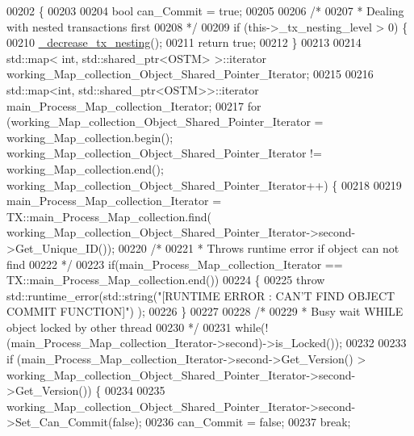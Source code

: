 \begin{DoxyCode}
00202                 \{
00203 
00204     \textcolor{keywordtype}{bool} can\_Commit = \textcolor{keyword}{true};
00205  
00206     \textcolor{comment}{/*}
00207 \textcolor{comment}{     * Dealing with nested transactions first 
}
00208 \textcolor{comment}{     */}
00209     \textcolor{keywordflow}{if} (this->\_tx\_nesting\_level > 0) \{
00210         \hyperlink{class_t_x_aa3ac499f576326588628ade96b27b4b1}{\_decrease\_tx\_nesting}();
00211         \textcolor{keywordflow}{return} \textcolor{keyword}{true};
00212     \} 
00213     
00214     std::map< int, std::shared\_ptr<OSTM> >::iterator working\_Map\_collection\_Object\_Shared\_Pointer\_Iterator;
00215 
00216     std::map<int, std::shared\_ptr<OSTM>>::iterator main\_Process\_Map\_collection\_Iterator;
00217     \textcolor{keywordflow}{for} (working\_Map\_collection\_Object\_Shared\_Pointer\_Iterator = working\_Map\_collection.begin(); 
      working\_Map\_collection\_Object\_Shared\_Pointer\_Iterator != working\_Map\_collection.end(); 
      working\_Map\_collection\_Object\_Shared\_Pointer\_Iterator++) \{
00218 
00219             main\_Process\_Map\_collection\_Iterator = TX::main\_Process\_Map\_collection.find(
      working\_Map\_collection\_Object\_Shared\_Pointer\_Iterator->second->Get\_Unique\_ID());
00220             \textcolor{comment}{/*}
00221 \textcolor{comment}{             * Throws runtime error if object can not find
}
00222 \textcolor{comment}{             */}
00223             \textcolor{keywordflow}{if}(main\_Process\_Map\_collection\_Iterator == TX::main\_Process\_Map\_collection.end())
00224             \{
00225                 \textcolor{keywordflow}{throw} std::runtime\_error(std::string(\textcolor{stringliteral}{"[RUNTIME ERROR : CAN'T FIND OBJECT COMMIT FUNCTION]"})
      );
00226             \}
00227 
00228         \textcolor{comment}{/*}
00229 \textcolor{comment}{         * Busy wait WHILE object locked by other thread
}
00230 \textcolor{comment}{         */}
00231         \textcolor{keywordflow}{while}(!(main\_Process\_Map\_collection\_Iterator->second)->is\_Locked());
00232 
00233         \textcolor{keywordflow}{if} (main\_Process\_Map\_collection\_Iterator->second->Get\_Version() > 
      working\_Map\_collection\_Object\_Shared\_Pointer\_Iterator->second->Get\_Version()) \{
00234 
00235             working\_Map\_collection\_Object\_Shared\_Pointer\_Iterator->second->Set\_Can\_Commit(\textcolor{keyword}{false});
00236             can\_Commit = \textcolor{keyword}{false};
00237             \textcolor{keywordflow}{break};

\end{DoxyCode}
